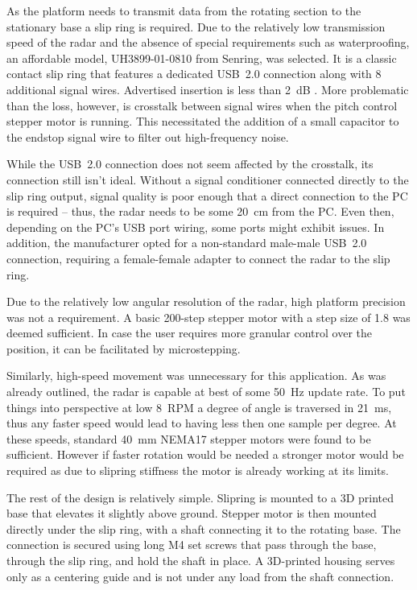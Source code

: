 As the platform needs to transmit data from the rotating section to the stationary base a slip ring is required.
Due to the relatively low transmission speed of the radar and the absence of special requirements such as waterproofing, an affordable model, UH3899-01-0810 from Senring, was selected.
It is a classic contact slip ring that features a dedicated USB~2.0 connection along with 8 additional signal wires.
Advertised insertion is less than 2~dB \cite{slipring}.
More problematic than the loss, however, is crosstalk between signal wires when the pitch control stepper motor is running.
This necessitated the addition of a small capacitor to the endstop signal wire to filter out high-frequency noise.

While the USB~2.0 connection does not seem affected by the crosstalk, its connection still isn't ideal.
Without a signal conditioner connected directly to the slip ring output, signal quality is poor enough that a direct connection to the PC is required -- thus, the radar needs to be some 20~cm from the PC.
Even then, depending on the PC's USB port wiring, some ports might exhibit issues.
In addition, the manufacturer opted for a non-standard male-male USB~2.0 connection, requiring a female-female adapter to connect the radar to the slip ring.

Due to the relatively low angular resolution of the radar, high platform precision was not a requirement.
A basic 200-step stepper motor with a step size of 1.8 was deemed sufficient.
In case the user requires more granular control over the position, it can be facilitated by microstepping.

Similarly, high-speed movement was unnecessary for this application.
As was already outlined, the radar is capable at best of some 50~Hz update rate.
To put things into perspective at low 8~RPM a degree of angle is traversed in 21~ms, thus any faster speed would lead to having less then one sample per degree.
At these speeds, standard 40~mm NEMA17 stepper motors were found to be sufficient.
However if faster rotation would be needed a stronger motor would be required as due to slipring stiffness the motor is already working at its limits.

The rest of the design is relatively simple.
Slipring is mounted to a 3D printed base that elevates it slightly above ground.
Stepper motor is then mounted directly under the slip ring, with a shaft connecting it to the rotating base.
The connection is secured using long M4 set screws that pass through the base, through the slip ring, and hold the shaft in place.
A 3D-printed housing serves only as a centering guide and is not under any load from the shaft connection.

